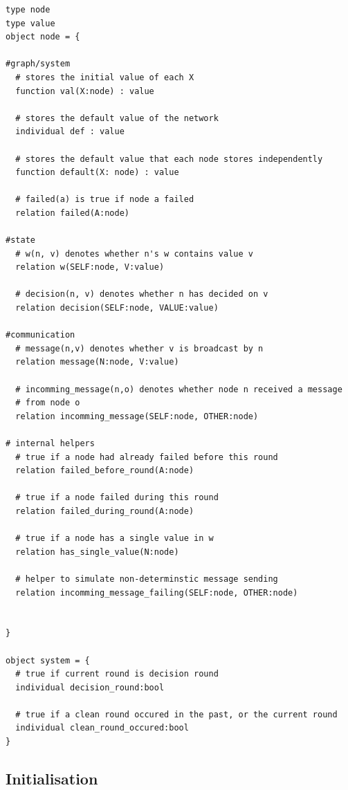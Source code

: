 \documentclass[fleqn]{article}
\begin{document}
\begin{mdframed}[backgroundcolor=light-gray, roundcorner=10pt,leftmargin=1, rightmargin=1, innerleftmargin=15, innertopmargin=15,innerbottommargin=15, outerlinewidth=1, linecolor=light-gray]
\begin{lstlisting}
type node
type value
object node = {

#graph/system
  # stores the initial value of each X
  function val(X:node) : value

  # stores the default value of the network
  individual def : value

  # stores the default value that each node stores independently
  function default(X: node) : value

  # failed(a) is true if node a failed
  relation failed(A:node)

#state
  # w(n, v) denotes whether n's w contains value v
  relation w(SELF:node, V:value)

  # decision(n, v) denotes whether n has decided on v
  relation decision(SELF:node, VALUE:value)

#communication
  # message(n,v) denotes whether v is broadcast by n
  relation message(N:node, V:value)

  # incomming_message(n,o) denotes whether node n received a message
  # from node o
  relation incomming_message(SELF:node, OTHER:node)

# internal helpers
  # true if a node had already failed before this round
  relation failed_before_round(A:node)

  # true if a node failed during this round
  relation failed_during_round(A:node)

  # true if a node has a single value in w
  relation has_single_value(N:node)

  # helper to simulate non-determinstic message sending
  relation incomming_message_failing(SELF:node, OTHER:node)


}

object system = {
  # true if current round is decision round
  individual decision_round:bool

  # true if a clean round occured in the past, or the current round
  individual clean_round_occured:bool
}
\end{lstlisting}
\end{mdframed}

\subsection{Initialisation}
\end{document}
